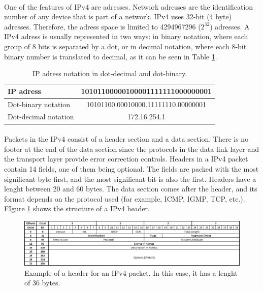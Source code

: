 \paragraph{}One of the features of IPv4 are adresses. Network adresses are the identification number of any device that is part of a network. IPv4 uses 32-bit (4 byte) adresses. Therefore, the adress space is limited to 4294967296 ($2^{32}$) adresses. A IPv4 adress is usually represented in two ways: in binary notation, where each group of 8 bits is separated by a dot, or in decimal notation, where each 8-bit binary number is translated to decimal, as it can be seen in Table \ref{table:IPadress}.
\begin{table}[H]
\begin{center}
\begin{tabular}{|l|c|}
\hline 
IP adress & 10101100000100001111111000000001 \\ 
\hline 
Dot-binary notation & 10101100.00010000.11111110.00000001 \\ 
\hline 
Dot-decimal notation & 172.16.254.1 \\ 
\hline
\end{tabular}
\end{center}
\caption[IP adress notation]{IP adress notation in dot-decimal and dot-binary.}
\label{table:IPadress}
\end{table}
\paragraph{}Packets in the IPv4 consist of a header section and a data section. There is no footer at the end of the data section since the protocols in the data link layer and the transport layer provide error correction controls. Headers in a IPv4 packet contain 14 fields, one of them being optional. The fields are packed with the most significant byte first, and the most significant bit is also the first. Headers have a lenght between 20 and 60 bytes. The data section comes after the header, and its format depends on the protocol used (for example, ICMP, IGMP, TCP, etc.). FIgure \ref{fig:IPv4header} shows the structure of a IPv4 header.
\begin{figure}[H]
\begin{center}
\includegraphics[scale=0.6]{IPv4_header.PNG}
\caption[IPv4 header]{Example of a header for an IPv4 packet. In this case, it has a lenght of 36 bytes.}
\label{fig:IPv4header}
\end{center}
\end{figure}
